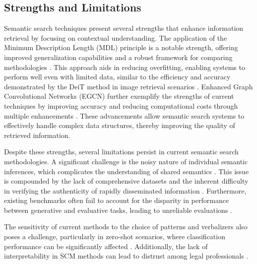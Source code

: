 
\subsection{Strengths and Limitations} \label{subsec:Strengths and Limitations}

Semantic search techniques present several strengths that enhance information retrieval by focusing on contextual understanding. The application of the Minimum Description Length (MDL) principle is a notable strength, offering improved generalization capabilities and a robust framework for comparing methodologies \cite{abudy2023minimumdescriptionlengthhopfield}. This approach aids in reducing overfitting, enabling systems to perform well even with limited data, similar to the efficiency and accuracy demonstrated by the DeiT method in image retrieval scenarios \cite{timagetran4}. Enhanced Graph Convolutional Networks (EGCN) further exemplify the strengths of current techniques by improving accuracy and reducing computational costs through multiple enhancements \cite{ullah2019graphconvolutionalnetworksanalysis}. These advancements allow semantic search systems to effectively handle complex data structures, thereby improving the quality of retrieved information.



Despite these strengths, several limitations persist in current semantic search methodologies. A significant challenge is the noisy nature of individual semantic inferences, which complicates the understanding of shared semantics \cite{raposo2019lowdimensionalembodiedsemanticsmusic}. This issue is compounded by the lack of comprehensive datasets and the inherent difficulty in verifying the authenticity of rapidly disseminated information \cite{shu2017fakenewsdetectionsocial}. Furthermore, existing benchmarks often fail to account for the disparity in performance between generative and evaluative tasks, leading to unreliable evaluations \cite{oh2024generativeaiparadoxevaluation}. 



The sensitivity of current methods to the choice of patterns and verbalizers also poses a challenge, particularly in zero-shot scenarios, where classification performance can be significantly affected \cite{gao2023benefitslabeldescriptiontrainingzeroshot}. Additionally, the lack of interpretability in SCM methods can lead to distrust among legal professionals \cite{lin2023interpretabilityframeworksimilarcase}. 



